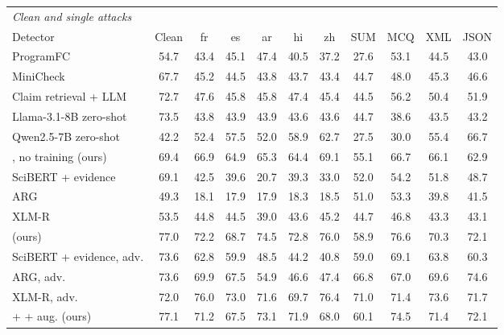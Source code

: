 \begin{table}[t]\centering\small\setlength{\tabcolsep}{4.5pt}
\begin{adjustbox}{max width=\textwidth}\begin{tabular}{lcccccccccc}
\toprule
\multicolumn{11}{l}{\emph{Clean and single attacks}} \\
Detector & Clean & fr & es & ar & hi & zh & SUM & MCQ & XML & JSON \\
\midrule
ProgramFC \citep{pan2023programfc} & 54.7 & 43.4 & 45.1 & 47.4 & 40.5 & 37.2 & 27.6 & 53.1 & 44.5 & 43.0 \\
MiniCheck \citep{tang2024minicheck} & 67.7 & 45.2 & 44.5 & 43.8 & 43.7 & 43.4 & 44.7 & 48.0 & 45.3 & 46.6 \\
Claim retrieval + LLM \citep{pikuliak2023multiclaim} & 72.7 & 47.6 & 45.8 & 45.8 & 47.4 & 45.4 & 44.5 & 56.2 & 50.4 & 51.9 \\
Llama-3.1-8B zero-shot \citep{grattafiori2024llama3} & 73.5 & 43.8 & 43.9 & 43.9 & 43.6 & 43.6 & 44.7 & 38.6 & 43.5 & 43.2 \\
Qwen2.5-7B zero-shot \citep{qwen2024qwen25} & 42.2 & 52.4 & 57.5 & 52.0 & 58.9 & 62.7 & 27.5 & 30.0 & 55.4 & 66.7 \\
\method{}, no training (ours) & 69.4 & 66.9 & 64.9 & 65.3 & 64.4 & 69.1 & 55.1 & 66.7 & 66.1 & 62.9 \\
SciBERT + evidence \citep{kotonya2020pubhealth} & 69.1 & 42.5 & 39.6 & 20.7 & 39.3 & 33.0 & 52.0 & 54.2 & 51.8 & 48.7 \\
ARG \citep{hu2024arg} & 49.3 & 18.1 & 17.9 & 17.9 & 18.3 & 18.5 & 51.0 & 53.3 & 39.8 & 41.5 \\
XLM-R \citep{conneau2020xlmr} & 53.5 & 44.8 & 44.5 & 39.0 & 43.6 & 45.2 & 44.7 & 46.8 & 43.3 & 43.1 \\
\method{} (ours) & 77.0 & 72.2 & 68.7 & 74.5 & 72.8 & 76.0 & 58.9 & 76.6 & 70.3 & 72.1 \\
\cmidrule(lr){1-11}
SciBERT + evidence, adv. \citep{kotonya2020pubhealth} & 73.6 & 62.8 & 59.9 & 48.5 & 44.2 & 40.8 & 59.0 & 69.1 & 63.8 & 60.3 \\
ARG, adv. \citep{hu2024arg} & 73.6 & 69.9 & 67.5 & 54.9 & 46.6 & 47.4 & 66.8 & 67.0 & 69.6 & 74.6 \\
XLM-R, adv. \citep{conneau2020xlmr} & 72.0 & 76.0 & 73.0 & 71.6 & 69.7 & 76.4 & 71.0 & 71.4 & 73.6 & 71.7 \\
\method{} + \air{} + aug. (ours) & 77.1 & 71.2 & 67.5 & 73.1 & 71.9 & 68.0 & 60.1 & 74.5 & 71.4 & 72.1 \\
\midrule

\end{tabular}
\end{adjustbox}
\end{table}
